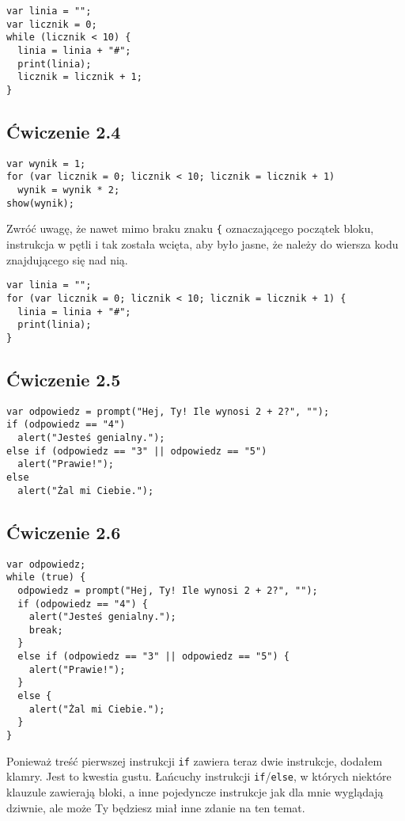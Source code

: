 \begin{verbatim} 
var linia = "";
var licznik = 0;
while (licznik < 10) {
  linia = linia + "#";
  print(linia);
  licznik = licznik + 1;
}
\end{verbatim}

\subsection*{Ćwiczenie 2.4}
\label{sol:2.4}

\begin{verbatim} 
var wynik = 1;
for (var licznik = 0; licznik < 10; licznik = licznik + 1)
  wynik = wynik * 2;
show(wynik);
\end{verbatim}
      
Zwróć uwagę, że nawet mimo braku znaku \texttt{\{} oznaczającego początek bloku, instrukcja w pętli i tak została wcięta, aby było jasne, że należy do wiersza kodu znajdującego się nad nią.

      
\begin{verbatim} 
var linia = "";
for (var licznik = 0; licznik < 10; licznik = licznik + 1) {
  linia = linia + "#";
  print(linia);
}
\end{verbatim}

\subsection*{Ćwiczenie 2.5}
\label{sol:2.5}

\begin{verbatim} 
var odpowiedz = prompt("Hej, Ty! Ile wynosi 2 + 2?", "");
if (odpowiedz == "4")
  alert("Jesteś genialny.");
else if (odpowiedz == "3" || odpowiedz == "5")
  alert("Prawie!");
else
  alert("Żal mi Ciebie.");
\end{verbatim}

\subsection*{Ćwiczenie 2.6}
\label{sol:2.6}

\begin{verbatim} 
var odpowiedz;
while (true) {
  odpowiedz = prompt("Hej, Ty! Ile wynosi 2 + 2?", "");
  if (odpowiedz == "4") {
    alert("Jesteś genialny.");
    break;
  }
  else if (odpowiedz == "3" || odpowiedz == "5") {
    alert("Prawie!");
  }
  else {
    alert("Żal mi Ciebie.");
  }
}
\end{verbatim}
      
Ponieważ treść pierwszej instrukcji \texttt{if} zawiera teraz dwie instrukcje, dodałem klamry. Jest to kwestia gustu. Łańcuchy instrukcji \texttt{if}/\texttt{else}, w których niektóre klauzule zawierają bloki, a inne pojedyncze instrukcje jak dla mnie wyglądają dziwnie, ale może Ty będziesz miał inne zdanie na ten temat.

